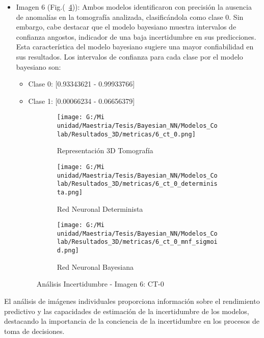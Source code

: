 \documentclass[10pt, oneside, a4paper]{article}
\begin{document}
\begin{itemize}
\begin{itemize}
	\item Imagen 6 (Fig.(~\ref{fig:layout_6})): Ambos modelos identificaron con precisión la ausencia de anomalías en la tomografía analizada, clasificándola como clase 0. Sin embargo, cabe destacar que el modelo bayesiano muestra intervalos de confianza angostos, indicador de una baja incertidumbre en sus predicciones. Esta característica del modelo bayesiano sugiere una mayor confiabilidad en sus resultados.
	Los intervalos de confianza para cada clase por el modelo bayesiano son:
	\begin{itemize}
	\item Clase 0: [0.93343621 - 0.99933766] 
	\item Clase 1: [0.00066234 - 0.06656379]
	\end{itemize}

\begin{figure}[H]
	\centering
	\begin{subfigure}[b]{0.6\textwidth}
		\centering
		\texttt{[image: G:/Mi unidad/Maestria/Tesis/Bayesian\_NN/Modelos\_Colab/Resultados\_3D/metricas/6\_ct\_0.png]} %
		\caption{Representación 3D Tomografía}
		\label{fig:6_ct0_1}
	\end{subfigure}
	
	\medskip
	
	\begin{subfigure}[b]{0.45\textwidth}
		\centering
		\texttt{[image: G:/Mi unidad/Maestria/Tesis/Bayesian\_NN/Modelos\_Colab/Resultados\_3D/metricas/6\_ct\_0\_determinista.png]}
		\caption{Red Neuronal Determinista}
		\label{fig:6_ct0_2}
	\end{subfigure}
	\hfill
	\begin{subfigure}[b]{0.45\textwidth}
		\centering
		\texttt{[image: G:/Mi unidad/Maestria/Tesis/Bayesian\_NN/Modelos\_Colab/Resultados\_3D/metricas/6\_ct\_0\_mnf\_sigmoid.png]}
		\caption{Red Neuronal Bayesiana}
		\label{fig:6_ct0_3}
	\end{subfigure}
	
	\caption{Análisis Incertidumbre - Imagen 6: CT-0}
	\label{fig:layout_6}
\end{figure}
	
	\end{itemize}
	
	
	\end{itemize}
	
	El análisis de imágenes individuales proporciona información sobre el rendimiento predictivo y las capacidades de estimación de la incertidumbre de los modelos, destacando la importancia de la conciencia de la incertidumbre en los procesos de toma de decisiones.
	
\end{document}
